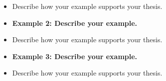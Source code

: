 \begin{enumerate}
\begin{itemize}
\item Describe how your example supports your thesis. \hrulefill
\noindent\makebox[\linewidth]{\rule{\paperwidth}{0.4pt}}

\item \bf{Example 2:} Describe your example. \hrulefill
\noindent\makebox[\linewidth]{\rule{\paperwidth}{0.4pt}}

\item Describe how your example supports your thesis. \hrulefill
\noindent\makebox[\linewidth]{\rule{\paperwidth}{0.4pt}}

\item \bf{Example 3:} Describe your example. \hrulefill
\noindent\makebox[\linewidth]{\rule{\paperwidth}{0.4pt}}

\item Describe how your example supports your thesis. \hrulefill
\noindent\makebox[\linewidth]{\rule{\paperwidth}{0.4pt}}

\end{itemize}

\end{enumerate} 


